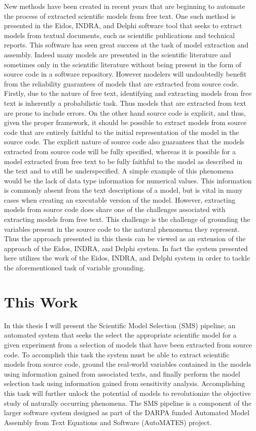 New methods have been created in recent years that are beginning to automate the process of extracted scientific models from free text. One such method is presented in the Eidos, INDRA, and Delphi \cite{EidosIndraDelphi} software tool that seeks to extract models from textual documents, such as scientific publications and technical reports. This software has seen great success at the task of model extraction and assembly. Indeed many models are presented in the scientific literature and sometimes only in the scientific literature without being present in the form of source code in a software repository. However modelers will undoubtedly benefit from the reliability guarantees of models that are extracted from source code. Firstly, due to the nature of free text, identifying and extracting models from free text is inherently a probabilistic task. Thus models that are extracted from text are prone to include errors. On the other hand source code is explicit, and thus, given the proper framework, it should be possible to extract models from source code that are entirely faithful to the initial representation of the model in the source code. The explicit nature of source code also guarantees that the models extracted from source code will be fully specified, whereas it is possible for a model extracted from free text to be fully faithful to the model as described in the text and to still be underspecified. A simple example of this phenomena would be the lack of data type information for numerical values. This information is commonly absent from the text descriptions of a model, but is vital in many cases when creating an executable version of the model. However, extracting models from source code does share one of the challenges associated with extracting models from free text. This challenge is the challenge of grounding the variables present in the source code to the natural phenomena they represent. Thus the approach presented in this thesis can be viewed as an extension of the approach of the Eidos, INDRA, and Delphi system. In fact the system presented here utilizes the work of the Eidos, INDRA, and Delphi system in order to tackle the aforementioned task of variable grounding.

\section{This Work\label{sec:this_work}}
In this thesis I will present the Scientific Model Selection (SMS) pipeline; an automated system that seeks the select the appropriate scientific model for a given experiment from a selection of models that have been extracted from source code.
To accomplish this task the system must be able to extract scientific models from source code, ground the real-world variables contained in the models using information gained from associated texts, and finally perform the model selection task using information gained from sensitivity analysis.
Accomplishing this task will further unlock the potential of models to revolutionize the objective study of naturally occurring phenomena.
The SMS pipeline is a component of the larger software system designed as part of the DARPA funded Automated Model Assembly from Text Equations and Software (AutoMATES) project.

